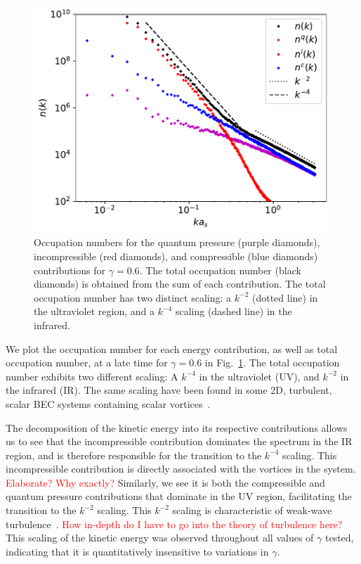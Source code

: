 \begin{figure}[t!]
    \centering
    \includegraphics[scale=0.75]{gfx/ch-twoCompDynamics/spectra.pdf}
    \caption[Occupation numbers for quantum pressure, incompressible and
        compressible contributions]
    {Occupation numbers for the quantum pressure (purple diamonds),
        incompressible (red diamonds), and compressible (blue diamonds)
        contributions for \(\gamma=0.6\).
        The total occupation number (black diamonds) is obtained from the sum of
        each contribution.
        The total occupation number has two distinct scaling: a \(k^{-2}\)
        (dotted line) in the ultraviolet region, and a \(k^{-4}\) scaling
        (dashed line) in the infrared.\label{fig:kinetic-energy-spectra}}
\end{figure}
We plot the occupation number for each energy contribution, as well as total
occupation number, at a late time for \(\gamma=0.6\) in
Fig.~\ref{fig:kinetic-energy-spectra}.
The total occupation number exhibits two different scaling: A \(k^{-4}\) in the
ultraviolet (UV), and \(k^{-2}\) in the infrared (IR).
The same scaling have been found in some 2D, turbulent, scalar BEC systems
containing scalar vortices~\cite{Nowak2012}.

The decomposition of the kinetic energy into its respective contributions
allows us to see that the incompressible contribution dominates the spectrum
in the IR region, and is therefore responsible for the transition to the
\(k^{-4}\) scaling.
This incompressible contribution is directly associated with the vortices in
the system. \textcolor{red}{Elaborate? Why exactly?}
Similarly, we see it is both the compressible and quantum pressure contributions
that dominate in the UV region, facilitating the transition to the \(k^{-2}\)
scaling.
This \(k^{-2}\) scaling is characteristic of weak-wave
turbulence~\cite{Zakharov1992}.
\textcolor{red}{How in-depth do I have to go into the theory of turbulence
    here?}
This scaling of the kinetic energy was observed throughout all values of
\(\gamma \) tested, indicating that it is quantitatively insensitive to
variations in \(\gamma \).

